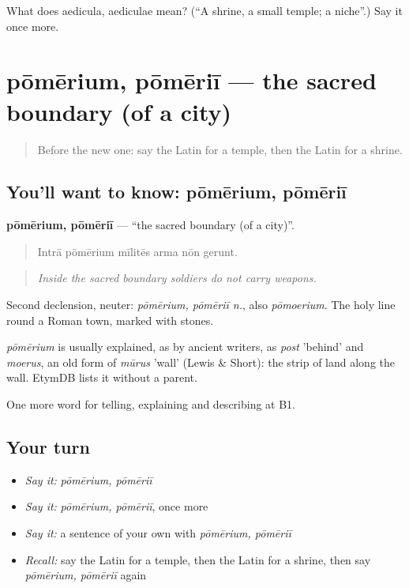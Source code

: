 \begin{tcolorbox}[breakable,colback=teal!4,colframe=teal!35!black,title={Before you move on}]
What does aedicula, aediculae mean? (\textquotedblleft{}A shrine, a small temple; a niche\textquotedblright{}.) Say it once more.
\end{tcolorbox}
\section[pōmērium, pōmēriī]{pōmērium, pōmēriī — the sacred boundary (of a city)}

\label{lesson:LA-C459-pomerium}



\begin{quote}
Before the new one: say the Latin for a temple, then the Latin for a shrine.
\end{quote}

\subsection*{You'll want to know: pōmērium, pōmēriī}
\textbf{pōmērium, pōmēriī} — \textquotedblleft{}the sacred boundary (of a city)\textquotedblright{}.

\begin{quote}
Intrā pōmērium mīlitēs arma nōn gerunt.
\end{quote}

\begin{quote}
\emph{Inside the sacred boundary soldiers do not carry weapons.}
\end{quote}

Second declension, neuter: \emph{pōmērium, pōmēriī n.}, also \emph{pōmoerium}. The holy line round a Roman town, marked with stones.

\begin{cousinweb}
\emph{pōmērium} is usually explained, as by ancient writers, as \emph{post} 'behind' and \emph{moerus}, an old form of \emph{mūrus} 'wall' (Lewis \& Short): the strip of land along the wall. EtymDB lists it without a parent.
\end{cousinweb}

\begin{grammarlens}[title={What you've built}]
One more word for telling, explaining and describing at B1.
\end{grammarlens}

\subsection*{Your turn}
\begin{itemize}
\raggedright
  \item \emph{Say it:} \emph{pōmērium, pōmēriī}
  \item \emph{Say it:} \emph{pōmērium, pōmēriī}, once more
  \item \emph{Say it:} a sentence of your own with \emph{pōmērium, pōmēriī}
  \item \emph{Recall:} say the Latin for a temple, then the Latin for a shrine, then say \emph{pōmērium, pōmēriī} again
\end{itemize}

